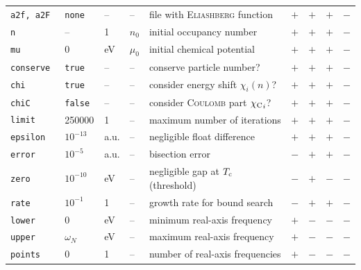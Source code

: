 \documentclass[a4paper]{article}
\def\sub#1{\sb{\mathrm{#1}}}
\newlength\gap
\begin{document}
\begin{table}[b]
\begin{tabular}{*9l}
         \tt a2f, a2F      & \tt none    & --               & --                  & file with \textsc{Eliashberg} function     & $+$ & $+$ & $+$ & $-$ \\[\gap]
         \tt n             & --          & 1                & $n_0$               & initial occupancy number                   & $+$ & $+$ & $+$ & $-$ \\
         \tt mu            & 0           & eV               & $\mu_0$             & initial chemical potential                 & $+$ & $+$ & $+$ & $-$ \\
         \tt conserve      & \tt true    & --               & --                  & conserve particle number?                  & $+$ & $+$ & $+$ & $-$ \\
         \tt chi           & \tt true    & --               & --                  & consider energy shift $\chi_i(n)$?         & $+$ & $+$ & $+$ & $-$ \\
         \tt chiC          & \tt false   & --               & --           & consider \textsc{Coulomb} part ${\chi \sub C}_i$? & $+$ & $+$ & $+$ & $-$ \\[\gap]
         \tt limit         & 250000      & 1                & --                  & maximum number of iterations               & $+$ & $+$ & $+$ & $-$ \\[\gap]
         \tt epsilon       & $10^{-13}$  & a.u.             & --                  & negligible float difference                & $+$ & $+$ & $+$ & $-$ \\
         \tt error         & $10^{-5}$   & a.u.             & --                  & bisection error                            & $-$ & $+$ & $+$ & $-$ \\
         \tt zero          & $10^{-10}$  & eV               & --                  & negligible gap at $T \sub c$ (threshold)   & $-$ & $+$ & $-$ & $-$ \\
         \tt rate          & $10^{-1}$   & 1                & --                  & growth rate for bound search               & $-$ & $+$ & $+$ & $-$ \\[\gap]
         \tt lower         & 0           & eV               & --                  & minimum real-axis frequency                & $+$ & $-$ & $-$ & $-$ \\
         \tt upper         & $\omega_N$  & eV               & --                  & maximum real-axis frequency                & $+$ & $-$ & $-$ & $-$ \\
         \tt points        & 0           & 1                & --                  & number of real-axis frequencies            & $+$ & $-$ & $-$ & $-$ \\

\end{tabular}
\end{table}
\end{document}
